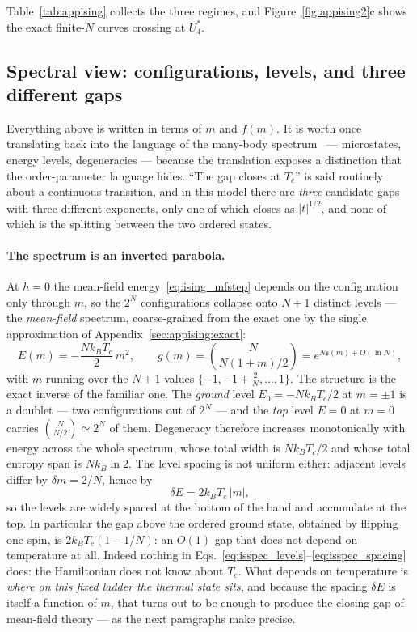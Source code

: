 \documentclass[10pt,a4paper]{article}
\theoremstyle{remark}
\begin{document}
Table~\ref{tab:appising} collects the three regimes, and
Figure~\ref{fig:appising2}c shows the exact finite-$N$ curves crossing at
$U_4^{\ast}$.

\subsection{Spectral view: configurations, levels, and three different gaps}
\label{sec:appising:spectrum}

Everything above is written in terms of $m$ and $f(m)$. It is worth once
translating back into the language of the many-body spectrum~\cite{DOSNotes} --- microstates,
energy levels, degeneracies --- because the translation exposes a distinction
that the order-parameter language hides. ``The gap closes at $T_c$'' is said
routinely about a continuous transition, and in this model there are \emph{three}
candidate gaps with three different exponents, only one of which closes as
$|t|^{1/2}$, and none of which is the splitting between the two ordered states.

\paragraph{The spectrum is an inverted parabola.} At $h=0$ the mean-field
energy~\eqref{eq:ising_mfstep} depends on the configuration only through $m$, so
the $2^{N}$ configurations collapse onto $N+1$ distinct levels --- the
\emph{mean-field} spectrum, coarse-grained from the exact one by the single
approximation of Appendix~\ref{sec:appising:exact}:
\begin{equation}\label{eq:isspec_levels}
E(m)=-\frac{N k_BT_c}{2}\,m^{2},
\qquad
g(m)=\binom{N}{N(1+m)/2}=e^{N\mathfrak{s}(m)+O(\ln N)},
\end{equation}
with $m$ running over the $N+1$ values $\{-1,-1+\tfrac2N,\dots,1\}$.
The structure is the exact inverse of the familiar one. The \emph{ground} level
$E_0=-Nk_BT_c/2$ at $m=\pm1$ is a doublet --- two configurations out of $2^{N}$ ---
and the \emph{top} level $E=0$ at $m=0$ carries $\binom{N}{N/2}\simeq2^{N}$ of
them. Degeneracy therefore increases monotonically with energy across the whole
spectrum, whose total width is $Nk_BT_c/2$ and whose total entropy span is
$Nk_B\ln2$. The level spacing is not uniform either: adjacent levels differ by
$\delta m=2/N$, hence by
\begin{equation}\label{eq:isspec_spacing}
\delta E=2k_BT_c\,|m| ,
\end{equation}
so the levels are widely spaced at the bottom of the band and accumulate at the
top. In particular the gap above the ordered ground state, obtained by flipping
one spin, is $2k_BT_c(1-1/N)$: an $O(1)$ gap that does not depend on temperature
at all. Indeed nothing in Eqs.~\eqref{eq:isspec_levels}--\eqref{eq:isspec_spacing}
does: the Hamiltonian does not know about $T_c$. What depends on temperature is
\emph{where on this fixed ladder the thermal state sits}, and because the spacing
$\delta E$ is itself a function of $m$, that turns out to be enough to produce
the closing gap of mean-field theory --- as the next paragraphs make precise.
\end{document}
